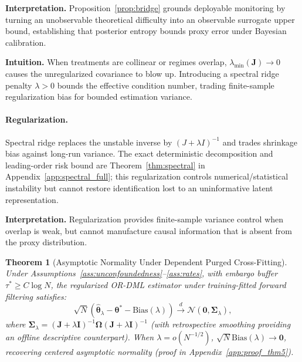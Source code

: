 \documentclass[twoside]{article}
\newtheorem{theorem}{Theorem}
\theoremstyle{definition}
\begin{document}
\textbf{Interpretation.} Proposition~\ref{prop:bridge} grounds deployable monitoring by turning an unobservable theoretical difficulty into an observable surrogate upper bound, establishing that posterior entropy bounds proxy error under Bayesian calibration.

\textbf{Intuition.} When treatments are collinear or regimes overlap, $\lambda_{\min}(\boldsymbol{J}) \to 0$ causes the unregularized covariance to blow up. Introducing a spectral ridge penalty $\lambda > 0$ bounds the effective condition number, trading finite-sample regularization bias for bounded estimation variance.

\paragraph{Regularization.} Spectral ridge replaces the unstable inverse by $(J+\lambda I)^{-1}$ and trades shrinkage bias against long-run variance. The exact deterministic decomposition and leading-order risk bound are Theorem~\ref{thm:spectral} in Appendix~\ref{app:spectral_full}; this regularization controls numerical/statistical instability but cannot restore identification lost to an uninformative latent representation.

\textbf{Interpretation.} Regularization provides finite-sample variance control when overlap is weak, but cannot manufacture causal information that is absent from the proxy distribution.

\begin{theorem}[Asymptotic Normality Under Dependent Purged Cross-Fitting]
\label{thm:asymptotics}
Under Assumptions~\ref{ass:unconfoundedness}--\ref{ass:rates}, with embargo buffer $\tau^* \ge C \log N$, the regularized OR-DML estimator under training-fitted forward filtering satisfies:
\begin{equation}
    \sqrt{N}\left( \hat{\boldsymbol{\theta}}_\lambda - \boldsymbol{\theta}^* - \mathrm{Bias}(\lambda) \right) \xrightarrow{d} \mathcal{N}\left(\mathbf{0}, \boldsymbol{\Sigma}_\lambda\right),
\end{equation}
where $\boldsymbol{\Sigma}_\lambda = (\boldsymbol{J} + \lambda \boldsymbol{I})^{-1} \boldsymbol{\Omega} (\boldsymbol{J} + \lambda \boldsymbol{I})^{-1}$ (with retrospective smoothing providing an offline descriptive counterpart). When $\lambda = o(N^{-1/2})$, $\sqrt{N}\mathrm{Bias}(\lambda) \to \mathbf{0}$, recovering centered asymptotic normality (proof in Appendix~\ref{app:proof_thm5}).
\end{theorem}
\end{document}
